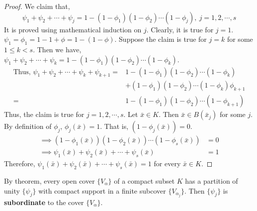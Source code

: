 \begin{proof}
	We claim that,
	\begin{equation}
		\psi_1+\psi_2 + \cdots+\psi_j = 1 - (1-\phi_1)(1-\phi_2)\cdots(1-\phi_j),\ j = 1,2,\cdots,s
	\end{equation}
	It is proved using mathematical induction on $j$.
	Clearly, it is true for $j = 1$.
	$\psi_1 = \phi_1 = 1 - 1 + \phi = 1 - (1-\phi)$.
	Suppose the claim is true for $j = k$ for some $1 \le k < s$.
	Then we have, $\psi_1 + \psi_2 + \cdots + \psi_k = 1-(1-\phi_1)(1-\phi_2)\cdots(1-\phi_k)$.
	\begin{align*}
		\text{Thus, }\psi_1 + \psi_2 + \cdots + \psi_k + \psi_{k+1} = & 1-(1-\phi_1)(1-\phi_2)\cdots(1-\phi_k) \\
		& + (1-\phi_1)(1-\phi_2)\cdots(1-\phi_k)\phi_{k+1}\\
		= & 1-(1-\phi_1)(1-\phi_2)\cdots(1-\phi_{k+1})
	\end{align*}
	Thus, the claim is true for $j = 1,2,\cdots,s$.
	Let $\bar{x} \in K$.
	Then $\bar{x} \in B(\bar{x}_j)$ for some $j$.
	By definition of $\phi_j$, $\phi_j(\bar{x}) = 1$.
	That is, $(1-\phi_j(\bar{x})) = 0$.
	\begin{align*}
		\implies (1-\phi_1(\bar{x}))(1-\phi_2(\bar{x}))\cdots(1-\phi_s(\bar{x})) & = 0 \\
		\implies \psi_1(\bar{x}) + \psi_2(\bar{x}) + \cdots + \psi_s(\bar{x}) & = 1
	\end{align*}
	Therefore, $\psi_1(\bar{x}) + \psi_2(\bar{x}) + \cdots + \psi_s(\bar{x}) = 1$ for every $\bar{x} \in K$.
\end{proof}

\begin{definition}
	By theorem, every open cover $\{V_\alpha\}$ of a compact subset $K$ has a partition of unity $\{ \psi_j \}$ with compact support in a finite subcover $\{V_{\alpha_j}\}$.
	Then $\{ \psi_j \}$ is \textbf{subordinate} to the cover $\{V_\alpha\}$.
\end{definition}

